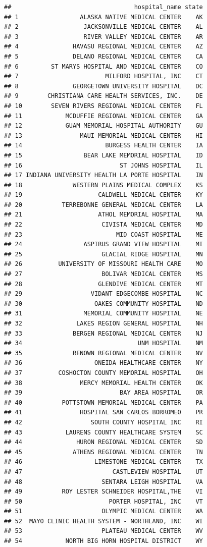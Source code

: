 \documentclass[
]{book}
\theoremstyle{definition}
\theoremstyle{definition}
\theoremstyle{definition}
\theoremstyle{definition}
\theoremstyle{remark}
\begin{document}
\begin{verbatim}
##                                  hospital_name state
## 1                 ALASKA NATIVE MEDICAL CENTER    AK
## 2                  JACKSONVILLE MEDICAL CENTER    AL
## 3                  RIVER VALLEY MEDICAL CENTER    AR
## 4               HAVASU REGIONAL MEDICAL CENTER    AZ
## 5               DELANO REGIONAL MEDICAL CENTER    CA
## 6         ST MARYS HOSPITAL AND MEDICAL CENTER    CO
## 7                        MILFORD HOSPITAL, INC    CT
## 8               GEORGETOWN UNIVERSITY HOSPITAL    DC
## 9        CHRISTIANA CARE HEALTH SERVICES, INC.    DE
## 10        SEVEN RIVERS REGIONAL MEDICAL CENTER    FL
## 11            MCDUFFIE REGIONAL MEDICAL CENTER    GA
## 12            GUAM MEMORIAL HOSPITAL AUTHORITY    GU
## 13                MAUI MEMORIAL MEDICAL CENTER    HI
## 14                       BURGESS HEALTH CENTER    IA
## 15                 BEAR LAKE MEMORIAL HOSPITAL    ID
## 16                           ST JOHNS HOSPITAL    IL
## 17 INDIANA UNIVERSITY HEALTH LA PORTE HOSPITAL    IN
## 18              WESTERN PLAINS MEDICAL COMPLEX    KS
## 19                     CALDWELL MEDICAL CENTER    KY
## 20           TERREBONNE GENERAL MEDICAL CENTER    LA
## 21                     ATHOL MEMORIAL HOSPITAL    MA
## 22                      CIVISTA MEDICAL CENTER    MD
## 23                          MID COAST HOSPITAL    ME
## 24                 ASPIRUS GRAND VIEW HOSPITAL    MI
## 25                      GLACIAL RIDGE HOSPITAL    MN
## 26          UNIVERSITY OF MISSOURI HEALTH CARE    MO
## 27                      BOLIVAR MEDICAL CENTER    MS
## 28                     GLENDIVE MEDICAL CENTER    MT
## 29                   VIDANT EDGECOMBE HOSPITAL    NC
## 30                    OAKES COMMUNITY HOSPITAL    ND
## 31                 MEMORIAL COMMUNITY HOSPITAL    NE
## 32               LAKES REGION GENERAL HOSPITAL    NH
## 33              BERGEN REGIONAL MEDICAL CENTER    NJ
## 34                                UNM HOSPITAL    NM
## 35              RENOWN REGIONAL MEDICAL CENTER    NV
## 36                    ONEIDA HEALTHCARE CENTER    NY
## 37          COSHOCTON COUNTY MEMORIAL HOSPITAL    OH
## 38                MERCY MEMORIAL HEALTH CENTER    OK
## 39                           BAY AREA HOSPITAL    OR
## 40           POTTSTOWN MEMORIAL MEDICAL CENTER    PA
## 41                HOSPITAL SAN CARLOS BORROMEO    PR
## 42                   SOUTH COUNTY HOSPITAL INC    RI
## 43            LAURENS COUNTY HEALTHCARE SYSTEM    SC
## 44               HURON REGIONAL MEDICAL CENTER    SD
## 45              ATHENS REGIONAL MEDICAL CENTER    TN
## 46                    LIMESTONE MEDICAL CENTER    TX
## 47                         CASTLEVIEW HOSPITAL    UT
## 48                      SENTARA LEIGH HOSPITAL    VA
## 49           ROY LESTER SCHNEIDER HOSPITAL,THE    VI
## 50                        PORTER HOSPITAL, INC    VT
## 51                      OLYMPIC MEDICAL CENTER    WA
## 52  MAYO CLINIC HEALTH SYSTEM - NORTHLAND, INC    WI
## 53                      PLATEAU MEDICAL CENTER    WV
## 54            NORTH BIG HORN HOSPITAL DISTRICT    WY
\end{verbatim}
\end{document}
